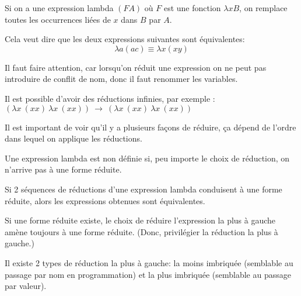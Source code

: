 \begin{mydef} Si on a une expression lambda $(FA)$ où
	$F$ est une fonction $\lambda xB$, on remplace toutes les occurrences liées
	de $x$ dans $B$ par $A$.
\end{mydef}

\begin{mydef}
	Cela veut dire que les deux expressions suivantes sont équivalentes:
	$$\lambda a (a c) \equiv \lambda x (x y)$$
\end{mydef}

\begin{myrem}
	Il faut faire attention, car lorsqu'on réduit une expression on ne peut
	pas introduire de conflit de nom, donc il faut renommer les variables.
\end{myrem}

\begin{myrem}
	Il est possible d'avoir des réductions infinies, par exemple :\\
	$(\lambda x\ (xx)\ \lambda x \ (xx)) \ \rightarrow \ (\lambda x\ (xx) \
\lambda x \ (xx))$
\end{myrem}

\begin{myrem}
	Il est important de voir qu'il y a plusieurs façons de réduire, ça
	dépend de l'ordre dans lequel on applique les réductions.
\end{myrem}

\begin{myprop}
	Une expression lambda est non définie si, peu importe le choix de
	réduction, on n'arrive pas à une forme réduite.
\end{myprop}

\begin{mytheo} Si 2 séquences de réductions d'une expression
	lambda conduisent à une forme réduite, alors les expressions obtenues
	sont équivalentes.
\end{mytheo}

\begin{myprop}
	Si une forme réduite existe, le choix de réduire l'expression la plus à
	gauche amène toujours à une forme réduite. (Donc, privilégier la
	réduction la plus à gauche.)
\end{myprop}

\begin{myrem}
	Il existe 2 types de réduction la plus à gauche: la moins imbriquée
	(semblable au passage par nom en programmation) et la plus imbriquée
	(semblable au passage par valeur).
\end{myrem}

